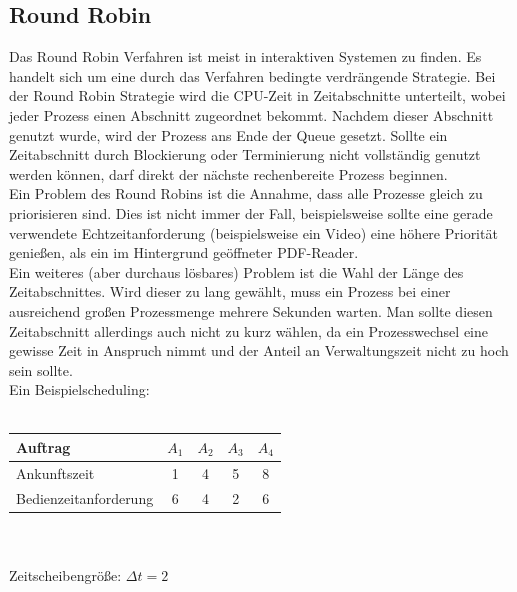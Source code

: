 \subsection{Round Robin}
Das Round Robin Verfahren ist meist in interaktiven Systemen zu finden. Es handelt sich um eine durch das 
Verfahren bedingte verdrängende Strategie. Bei der Round Robin Strategie wird die CPU-Zeit in 
Zeitabschnitte unterteilt, wobei jeder Prozess einen Abschnitt zugeordnet bekommt. Nachdem dieser Abschnitt 
genutzt wurde, wird der Prozess ans Ende der Queue gesetzt. Sollte ein Zeitabschnitt durch Blockierung oder 
Terminierung nicht vollständig genutzt werden können, darf direkt der nächste rechenbereite Prozess 
beginnen. \\
Ein Problem des Round Robins ist die Annahme, dass alle Prozesse gleich zu priorisieren sind. Dies ist 
nicht immer der Fall, beispielsweise sollte eine gerade verwendete Echtzeitanforderung (beispielsweise ein 
Video) eine höhere Priorität genießen, als ein im Hintergrund geöffneter PDF-Reader. \\
Ein weiteres (aber durchaus lösbares) Problem ist die Wahl der Länge des Zeitabschnittes. Wird dieser zu 
lang gewählt, muss ein Prozess bei einer ausreichend großen Prozessmenge mehrere Sekunden warten. Man 
sollte diesen Zeitabschnitt allerdings auch nicht zu kurz wählen, da ein Prozesswechsel eine gewisse Zeit 
in Anspruch nimmt und der Anteil an Verwaltungszeit nicht zu hoch sein sollte. \\
Ein Beispielscheduling: \\ \\
\begin{center}
\begin{tabular}{l||c|c|c|c}
	Auftrag               & \(A_1\)  & \(A_2\)  & \(A_3\) & \(A_4\) \\ \hline \hline
	Ankunftszeit		  & 1        &  4		& 5       & 8       \\ \hline
	Bedienzeitanforderung & 6        &  4       & 2       & 6       \\
\end{tabular} \\ \quad \\
Zeitscheibengröße: \(\Delta t = 2\)
\end{center}
\begin{center}
\begin{blockgraph}{25}{1}{0.4}
   
\end{blockgraph}
\end{center}

